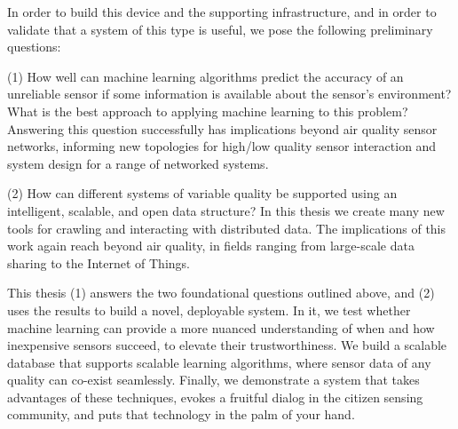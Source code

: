 In order to build this device and the supporting infrastructure, and in order to validate that a system of this type is useful, we pose the following preliminary questions:  

\enlargethispage{10\baselineskip}

(1) How well can machine learning algorithms predict the accuracy of an unreliable sensor if some information is available about the sensor's environment?  What is the best approach to applying machine learning to this problem?  Answering this question successfully has implications beyond air quality sensor networks, informing new topologies for high/low quality sensor interaction and system design for a range of networked systems.

(2) How can different systems of variable quality be supported using an intelligent, scalable, and open data structure?  In this thesis we create many new tools for crawling and interacting with distributed data.  The implications of this work again reach beyond air quality, in fields ranging from large-scale data sharing to the Internet of Things.

This thesis (1) answers the two foundational questions outlined above, and (2) uses the results to build a novel, deployable system.  In it, we test whether machine learning can provide a more nuanced understanding of when and how inexpensive sensors succeed, to elevate their trustworthiness.  We build a scalable database that supports scalable learning algorithms, where sensor data of any quality can co-exist seamlessly.  Finally, we demonstrate a system that takes advantages of these techniques, evokes a fruitful dialog in the citizen sensing community, and puts that technology in the palm of your hand.




%

